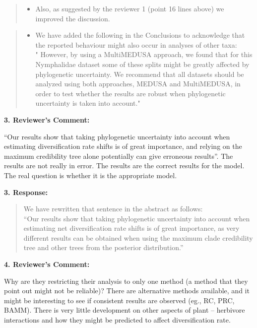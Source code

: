 \documentclass[]{article}
\begin{document}
\begin{quote}
\color{blue}
\begin{itemize}
\itemsep1pt\parskip0pt
\item
  Also, as suggested by the reviewer 1 (point 16 lines above) we
  improved the discussion.
\end{itemize}
\end{quote}

\begin{quote}
\color{blue}
\begin{itemize}
\itemsep1pt\parskip0pt
\item
  We have added the following in the Conclusions to acknowledge that the
  reported behaviour might also occur in analyses of other taxa:\\"
  However, by using a MultiMEDUSA approach, we found that for this
  Nymphalidae dataset some of these splits might be greatly affected by
  phylogenetic uncertainty. We recommend that all datasets should be
  analyzed using both approaches, MEDUSA and MultiMEDUSA, in order to
  test whether the results are robust when phylogenetic uncertainty is
  taken into account."
\end{itemize}
\end{quote}

\textbf{3. Reviewer's Comment:}

``Our results show that taking phylogenetic uncertainty into account
when estimating diversification rate shifts is of great importance, and
relying on the maximum credibility tree alone potentially can give
erroneous results''. The results are not really in error. The results
are the correct results for the model. The real question is whether it
is the appropriate model.

\textbf{3. Response:}

\begin{quote}
\color{blue}
We have rewritten that sentence in the abstract as follows:\\``Our
results show that taking phylogenetic uncertainty into account when
estimating net diversification rate shifts is of great importance, as
very different results can be obtained when using the maximum clade
credibility tree and other trees from the posterior distribution.''
\end{quote}

\textbf{4. Reviewer's Comment:}

Why are they restricting their analysis to only one method (a method
that they point out might not be reliable)? There are alternative
methods available, and it might be interesting to see if consistent
results are observed (eg., RC, PRC, BAMM). There is very little
development on other aspects of plant -- herbivore interactions and how
they might be predicted to affect diversification rate.
\end{document}
